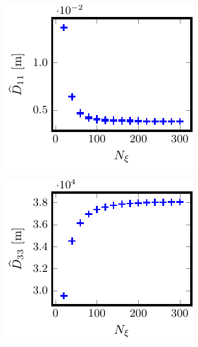 \documentclass[10pt]{iopart}
\begin{document}
\begin{figure}[]
	\centering
	\begin{subfigure}[t]{0.32\textwidth}
		\includegraphics{Convergence-Legendre-W7X-EIM-s0200-Er-3e-4-D11}
		\caption{}
		\label{subfig:D11_convergence_Legendre_W7X_EIM_0200_Erho_3e-4}
	\end{subfigure}
	\begin{subfigure}[t]{0.32\textwidth}
		\includegraphics{Convergence-Legendre-W7X-EIM-s0200-Er-3e-4-D33}
		\caption{}
		\label{subfig:D33_convergence_Legendre_W7X_EIM_0200_Erho_3e-4}
	\end{subfigure}
	

\end{figure}
\end{document}
